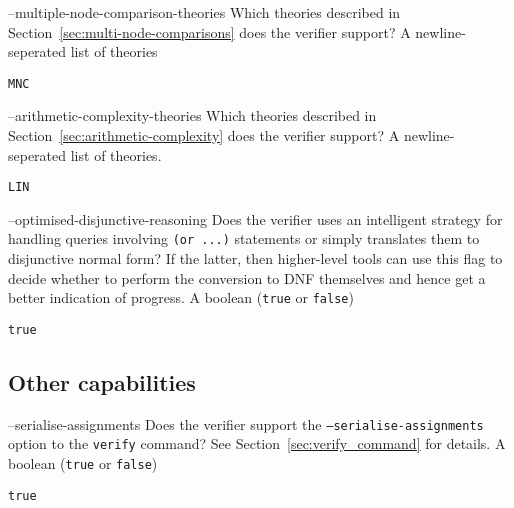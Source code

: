 \clOutputOption
{--multiple-node-comparison-theories}
{Which \multiComparison{} theories described in Section~\ref{sec:multi-node-comparisons} does the verifier support?}
{A newline-seperated list of theories}
\begin{lstlisting}[style=bash]
%*\exampleVerifier* supports --multiple-node-comparison-theories
MNC
\end{lstlisting}

\clOutputOption
{--arithmetic-complexity-theories}
{Which \arithComplexity{} theories described in Section~\ref{sec:arithmetic-complexity} does the verifier support?
}
{A newline-seperated list of theories.}
\begin{lstlisting}[style=bash]
%*\exampleVerifier* supports --arithmetic-complexity-theories
LIN
\end{lstlisting}

\clOutputOption
{--optimised-disjunctive-reasoning}
{Does the verifier uses an intelligent strategy for handling queries involving \texttt{(or ...)} statements or simply translates them to disjunctive normal form? If the latter, then higher-level tools can use this flag to decide whether to perform the conversion to DNF themselves and hence get a better indication of progress.
}
{A boolean (\texttt{true} or \texttt{false})}
\begin{lstlisting}[style=bash]
%*\exampleVerifier* supports --optimised-disjunctive-reasoning
true
\end{lstlisting}

\subsection{Other capabilities}
\label{sec:other-capabilities}

\clOutputOption
{--serialise-assignments}
{Does the verifier support the \texttt{--serialise-assignments} option to the \texttt{verify} command? See Section~\ref{sec:verify_command} for details.}
{A boolean (\texttt{true} or \texttt{false})}
\begin{lstlisting}[style=bash]
%*\exampleVerifier* supports --serialise-assignments
true
\end{lstlisting}




